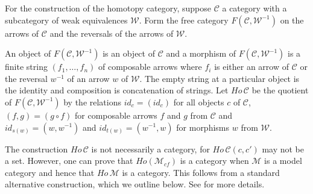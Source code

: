 For the construction of the homotopy category, suppose $\mathscr{C}$ a category with a subcategory of weak equivalences $\mathscr{W}$. Form the free category $F(\mathscr{C} ,\mathscr{W} ^{-1})$ on the arrows of $\mathscr{C}$ and the reversals of the arrows of $\mathscr{W}$.

An object of $F(\mathscr{C} ,\mathscr{W} ^{-1})$ is an object of $\mathscr{C}$ and a morphism of $F(\mathscr{C} ,\mathscr{W} ^{-1})$ is a finite string $(f_1,\dots ,f_n)$ of composable arrows where $f_i$ is either an arrow of $\mathscr{C}$ or the reversal $w^{-1}$ of an arrow $w$ of $\mathscr{W}$. The empty string at a particular object is the identity and composition is concatenation of strings. Let $Ho\, \mathscr{C}$ be the quotient of $F(\mathscr{C} ,\mathscr{W} ^{-1})$ by the relations $id_c=(id_c)$ for all objects $c$ of $\mathscr{C}$, $(f,g)=(g\circ f)$ for composable arrows $f$ and $g$ from $\mathscr{C}$ and $id_{s(w)}=(w,w^{-1})$ and $id_{t(w)}=(w^{-1},w)$ for morphisms $w$ from $\mathscr{W}$.

The construction $Ho\, \mathscr{C}$ is not necessarily a category, for $Ho\, \mathscr{C} (c,c')$ may not be a set. However, one can prove that $Ho(\mathscr{M} _{cf})$ is a category when $\mathscr{M}$ is a model category and hence that $Ho\, \mathscr{M}$ is a category. This follows from a standard alternative construction, which we outline below. See \cite[Sec.~1.2, pp.~7--13]{Ho99} for more details.


